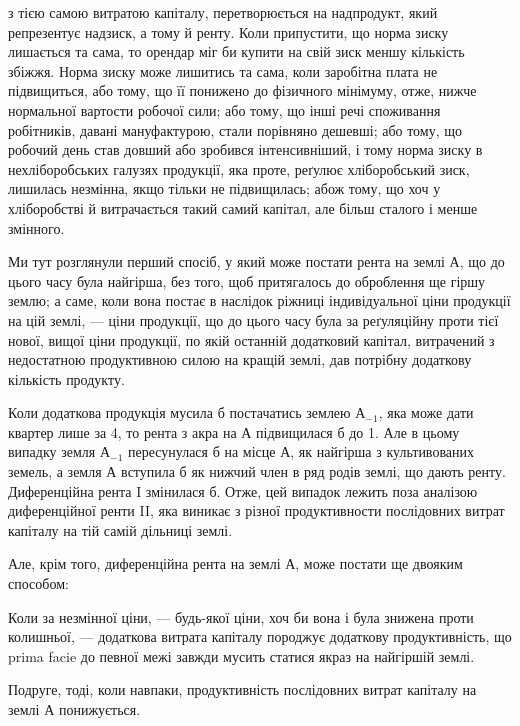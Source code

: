 \parcont{}  %
з тією самою витратою капіталу, перетворюється на надпродукт, який репрезентує
надзиск, а тому й ренту. Коли припустити, що норма зиску лишається
та сама, то орендар міг би купити на свій зиск меншу кількість збіжжя.
Норма зиску може лишитись та сама, коли заробітна плата не підвищиться,
або тому, що її понижено до фізичного мінімуму, отже, нижче нормальної вартости
робочої сили; або тому, що інші речі споживання робітників, давані мануфактурою,
стали порівняно дешевші; або тому, що робочий день став довший
або зробився інтенсивніший, і тому норма зиску в нехліборобських галузях
продукції, яка проте, реґулює хліборобський зиск, лишилась незмінна, якщо
тільки не підвищилась; абож тому, що хоч у хліборобстві й витрачається такий
самий капітал, але більш сталого і менше змінного.

Ми тут розглянули перший спосіб, у який може постати рента на землі
$А$, що до цього часу була найгірша, без того, щоб притягалось до оброблення
ще гіршу землю; а саме, коли вона постає в наслідок ріжниці індивідуальної
ціни продукції на цій землі, — ціни продукції, що до цього часу була за
реґуляційну проти тієї нової, вищої ціни продукції, по якій останній додатковий
капітал, витрачений з недостатною продуктивною силою на кращій землі,
дав потрібну додаткову кількість продукту.

Коли додаткова продукція мусила б постачатись землею $А_{-1}$, яка може дати
квартер лише за 4, то рента з акра на $А$ підвищилася б до 1. Але в цьому випадку
земля $А_{-1}$ пересунулася б на місце $А$, як
найгірша з культивованих земель, а земля $А$ вступила б як нижчий член в
ряд родів землі, що дають ренту. Диференційна рента I змінилася б. Отже,
цей випадок лежить поза аналізою диференційної ренти II, яка виникає з різної
продуктивности послідовних витрат капіталу на тій самій дільниці землі.

Але, крім того, диференційна рента на землі $А$, може постати ще двояким
способом:

Коли за незмінної ціни, — будь-якої ціни, хоч би вона і була знижена
проти колишньої, — додаткова витрата капіталу породжує додаткову продуктивність,
що prima facie до певної межі завжди мусить статися якраз на найгіршій
землі.

Подруге, тоді, коли навпаки, продуктивність послідовних витрат капіталу
на землі $А$ понижується.

